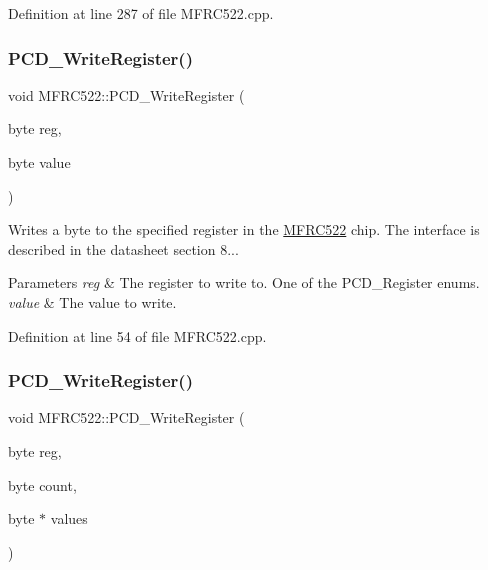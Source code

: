 Definition at line 287 of file M\+F\+R\+C522.\+cpp.

\mbox{\label{class_m_f_r_c522_aa97f1faf2a4c82b911d7c3ed2535bb59}} 
\subsubsection{\texorpdfstring{P\+C\+D\+\_\+\+Write\+Register()}{PCD\_WriteRegister()}\hspace{0.1cm}{\footnotesize\ttfamily [1/2]}}
{\footnotesize\ttfamily void M\+F\+R\+C522\+::\+P\+C\+D\+\_\+\+Write\+Register (\begin{DoxyParamCaption}\item[{byte}]{reg,  }\item[{byte}]{value }\end{DoxyParamCaption})}

Writes a byte to the specified register in the \hyperlink{class_m_f_r_c522}{M\+F\+R\+C522} chip. The interface is described in the datasheet section 8... 
\begin{DoxyParams}{Parameters}
{\em reg} & The register to write to. One of the P\+C\+D\+\_\+\+Register enums. \\
\hline
{\em value} & The value to write. \\
\hline
\end{DoxyParams}


Definition at line 54 of file M\+F\+R\+C522.\+cpp.

\mbox{\label{class_m_f_r_c522_a2141779996fc50861aafb89f9d12a163}} 
\subsubsection{\texorpdfstring{P\+C\+D\+\_\+\+Write\+Register()}{PCD\_WriteRegister()}\hspace{0.1cm}{\footnotesize\ttfamily [2/2]}}
{\footnotesize\ttfamily void M\+F\+R\+C522\+::\+P\+C\+D\+\_\+\+Write\+Register (\begin{DoxyParamCaption}\item[{byte}]{reg,  }\item[{byte}]{count,  }\item[{byte $\ast$}]{values }\end{DoxyParamCaption})}

